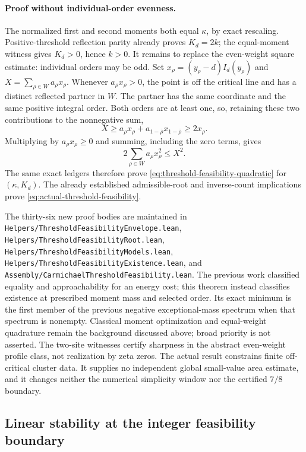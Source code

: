 \paragraph{Proof without individual-order evenness.}
The normalized first and second moments both equal \(\kappa\), by exact
rescaling.  Positive-threshold reflection parity already proves
\(K_d=2k\); the equal-moment witness gives \(K_d>0\), hence \(k>0\).
It remains to replace the even-weight square estimate: individual orders
may be odd.  Set \(x_\rho=(y_\rho-d)I_d(y_\rho)\) and
\(X=\sum_{\rho\in W}a_\rho x_\rho\).
Whenever \(a_\rho x_\rho>0\), the point is off the critical line and
has a distinct reflected partner in \(W\).  The partner has the same
coordinate and the same positive integral order.  Both orders are at
least one, so, retaining these two contributions to the nonnegative sum,
\[
 X\ge a_\rho x_\rho+a_{1-\overline\rho}x_{1-\overline\rho}
   \ge2x_\rho.
\]
Multiplying by \(a_\rho x_\rho\ge0\) and summing, including the zero
terms, gives
\[
 2\sum_{\rho\in W}a_\rho x_\rho^2\le X^2.
\]
The same exact ledgers therefore prove
\eqref{eq:threshold-feasibility-quadratic} for \((\kappa,K_d)\).
The already established admissible-root and inverse-count implications
prove \eqref{eq:actual-threshold-feasibility}.

The thirty-six new proof bodies are maintained in
\texttt{Helpers/ThresholdFeasibilityEnvelope.lean},
\texttt{Helpers/ThresholdFeasibilityRoot.lean},
\texttt{Helpers/ThresholdFeasibilityModels.lean},
\texttt{Helpers/ThresholdFeasibilityExistence.lean}, and
\texttt{Assembly/CarmichaelThresholdFeasibility.lean}.
The previous work classified equality and approachability for an energy
cost; this theorem instead classifies existence at prescribed moment mass
and selected order.  Its exact minimum is the first member of the previous
negative exceptional-mass spectrum when that spectrum is nonempty.
Classical moment optimization and equal-weight quadrature remain the
background discussed above; broad priority is not asserted.
The two-site witnesses certify sharpness in the abstract even-weight
profile class, not realization by zeta zeros.  The actual result constrains
finite off-critical cluster data.  It supplies no independent global
small-value area estimate, and it changes neither the numerical simplicity
window nor the certified \(7/8\) boundary.

\subsection{Linear stability at the integer feasibility boundary}
\label{subsec:threshold-feasibility-linear-stability}

